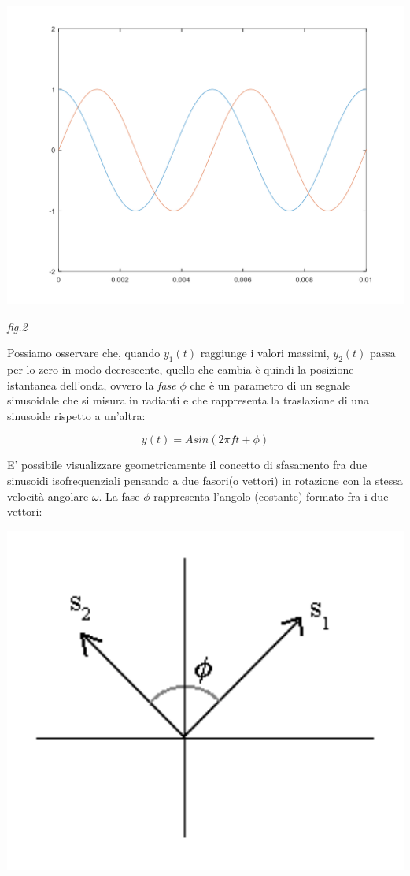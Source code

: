 \documentclass[11pt]{article}
\begin{document}
\begin{multicols*}{2}
\begin{center}
\includegraphics[scale=0.2]{images/plot02.png}

{\scriptsize \emph{fig.2 }}
\end{center}

Possiamo osservare che, quando $y_1(t)$ raggiunge i valori massimi, $y_2(t)$ passa per lo zero in modo decrescente, quello che cambia è quindi la posizione istantanea dell'onda, ovvero la \textit {fase} $\phi$ che è un parametro di un segnale sinusoidale che si misura in radianti e che rappresenta la traslazione di una sinusoide rispetto a un'altra:

\[
y(t) = Asin(2\pi ft + \phi)
\]

E' possibile visualizzare geometricamente il concetto di sfasamento fra due sinusoidi isofrequenziali pensando a due fasori(o vettori) in rotazione con la stessa velocità angolare $\omega$. La fase $\phi$ rappresenta l'angolo (costante) formato fra i due vettori:

\begin{center}
\includegraphics[scale=0.5]{images/plot03.png}


\end{center}
\end{multicols*}
\end{document}

